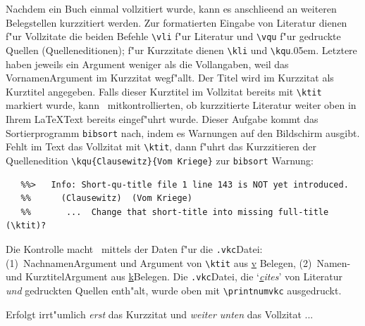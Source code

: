 \documentclass[12pt,a4paper]{article}
\begin{document}
 Nachdem ein Buch einmal vollzitiert wurde, kann es anschlie\hyss end an
 weiteren Belegstellen kurzzitiert werden. Zur formatierten Eingabe von
 Literatur dienen f"ur Vollzitate die beiden Befehle
 \hspace{-.125em}\verb|\vli| f"ur Literatur und \hspace{-.1em}\verb|\vqu|
 f"ur gedruckte Quellen (Quelleneditionen); f"ur Kurzzitate dienen
 \hspace{-.15em}\verb|\kli| und \hspace{-.075em}\verb|\kqu|\kern.05em. Letztere haben jeweils ein
 Argument weniger als die Vollangaben, weil das Vornamen\hy Argument im
 Kurzzitat wegf"allt. Der Titel wird im Kurzzitat als Kurztitel angegeben.
 Falls dieser Kurztitel im Vollzitat bereits mit \hspace{-.125em}\verb|\ktit| markiert
 wurde, kann \BibArts\ mitkontrollierten, ob kurzzitierte Literatur weiter
 oben in Ihrem \LaTeX\hy Text bereits eingef"uhrt wurde. Dieser Aufgabe
 kommt das Sortierprogramm \verb|bibsort| nach, indem es Warnungen auf den
 Bildschirm ausgibt. Fehlt im Text das Vollzitat mit\hspace{-.1em}
 \verb|\ktit|, dann f"uhrt das Kurzzitieren der Quellenedition\hspace{.1em}
 \verb|\kqu{Clausewitz}{Vom Kriege}|\hspace{.15em} zur \verb|bibsort|\hy
 Warnung:

  {\scriptsize\begin{verbatim}
   %%>   Info: Short-qu-title file 1 line 143 is NOT yet introduced.
   %%      (Clausewitz)  (Vom Kriege)  
   %%       ...  Change that short-title into missing full-title (\ktit)?
  \end{verbatim}}

 \vspace{-2ex}\noindent 
 Die Kontrolle macht \BibArts\ mittels der Daten f"ur die \hspace{-.2em}\verb|.vkc|\hy Datei: 
 (1)~Nachnamen\hy Argument und Argument von\hspace{-.1em} \verb|\ktit|\hspace{.1em} aus \underline{v\ko}\hy 
 Belegen, (2)~Namen- und Kurztitel\hy Argument aus \underline{k}\hy Belegen. 
 Die\hspace{-.2em} \verb|.vkc|\hy Datei, die `\ko\textit{\underline{c}ites}' 
 von Literatur \textit{und} gedruckten Quellen enth"alt, wurde oben mit 
 \verb|\printnumvkc| ausgedruckt.

 \vspace{1ex}\noindent
 Erfolgt irrt"umlich \textit{erst} das Kurzzitat und
 \textit{weiter unten} das Vollzitat ...
\end{document}
